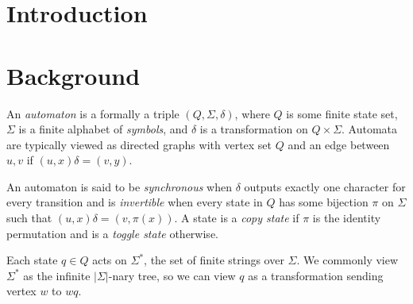 \documentclass[10pt,a4paper]{article} %
\theoremstyle{pleasant}
\newcommand{\defn}[1]{\textit{#1}}
\begin{document}
    \pagestyle{plain}
    \title{\rmfamily\normalfont{}}
    \author{}
    \date{} %
    
    \maketitle
    
    \begin{abstract}
        The word problem is a classic group-theoretic decision problem. It's known to be undecidable in surprisingly small subclasses of groups. We consider a class of semigroups generated by finite automata for which this problem is decidable. We consider several related decision problems for this subclass of semigroups.
    \end{abstract}
       
    \tableofcontents
    
    \section{Introduction}

    \section{Background}
    An \defn{automaton} is a formally a triple $(Q, \Sigma, \delta)$, where $Q$ is some finite state set, $\Sigma$ is a finite alphabet of \defn{symbols}, and $\delta$ is a transformation on $Q \times \Sigma$.
    Automata are typically viewed as directed graphs with vertex set $Q$ and an edge between $u, v$ if $(u, x)\delta = (v, y)$.

    An automaton is said to be \defn{synchronous} when $\delta$ outputs exactly one character for every transition and is \defn{invertible} when every state in $Q$ has some bijection $\pi$ on $\Sigma$ such that $(u, x)\delta = (v, \pi(x))$. A state is a \defn{copy state} if $\pi$ is the identity permutation and is a \defn{toggle state} otherwise.


    Each state $q \in Q$ acts on $\Sigma^*$, the set of finite strings over $\Sigma$. We commonly view $\Sigma^*$ as the infinite $|\Sigma|$-nary tree, so we can view $q$ as a transformation sending vertex $w$ to $wq$.
\end{document}
